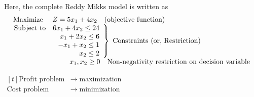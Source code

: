 \documentclass[../main-sheet.tex]{subfiles}
\begin{document}
\begin{ex}
\begin{enumerate}[label=Step \arabic*:]
              Here, the complete Reddy Mikks model is written as
              \[
                  \begin{array}{l}
                      \hspace{0.5em}\text{Maximize } \quad Z=5 x_{1}+4 x_{2} \quad\text{(objective function)\qquad} \\
                      \left.\begin{array}{r}
                                \text{Subject to} \quad
                                6 x_{1}+4 x_{2} \leq 24 \\
                                x_{1}+2 x_{2} \leq 6    \\
                                -x_{1}+x_{2} \leq 1     \\
                                x_{2} \leq 2            \\
                            \end{array}\right\} \text { Constraints (or, Restriction) }                             \\
                      \begin{array}{r}
                          \qquad \qquad \qquad \quad \hspace{1em} x_1,x_2\geq 0 \quad \text{Non-negativity restriction on decision variable} \\
                      \end{array}
                  \end{array}
              \]
              \begin{note}\(
                  \begin{aligned}[t]
                      \text{Profit problem} & \longrightarrow\; \text{maximization} \\
                      \text{Cost problem}   & \longrightarrow\; \text{minimization}
                  \end{aligned}\)
              \end{note}
    \end{enumerate}
\end{ex}
\end{document}
